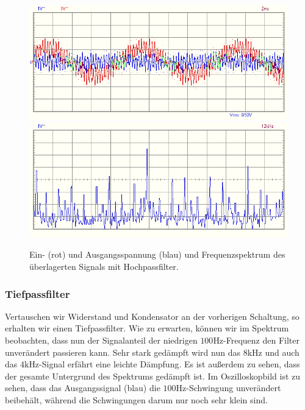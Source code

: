 \begin{figure}[H]
  \centering
  \includegraphics[width=.9\textwidth]{files/aufgabe8_teil2_hochpass_oszi.png}
  \includegraphics[width=.9\textwidth]{files/aufgabe8_teil2_hochpass_spectrum.png}
  \caption{Ein- (rot) und Ausgangsspannung (blau) und Frequenzspektrum des überlagerten Signals mit Hochpassfilter.}
  \label{fig:aufgabe8_teil2_hochpass}
\end{figure}

\newpage
\subsubsection*{Tiefpassfilter}

Vertauschen wir Widerstand und Kondensator an der vorherigen Schaltung, so erhalten wir einen Tiefpassfilter. Wie zu erwarten, können wir im Spektrum beobachten, dass nun der Signalanteil der niedrigen $100\si{\hertz}$-Frequenz den Filter unverändert passieren kann. Sehr stark gedämpft wird nun das $8\si{\kilo\hertz}$ und auch das $4\si{\kilo\hertz}$-Signal erfährt eine leichte Dämpfung. Es ist außerdem zu sehen, dass der gesamte Untergrund des Spektrums gedämpft ist. Im Oszilloskopbild ist zu sehen, dass das Ausgangssignal (blau) die $100\si{\hertz}$-Schwingung unverändert beibehält, während die Schwingungen darum nur noch sehr klein sind.

